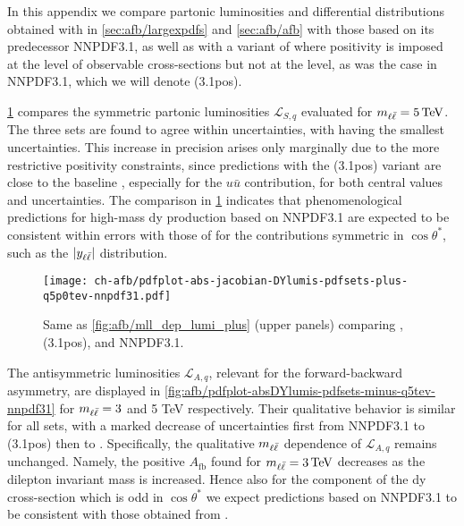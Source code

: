 
In this appendix we compare partonic luminosities and \lhc differential
distributions obtained with  in \cref{sec:afb/largexpdfs}
and \cref{sec:afb/afb} with those based 
on its predecessor
NNPDF3.1, as well as with a variant of 
where positivity is imposed at the level of observable cross-sections but
not at the \pdf level, as was the case in  NNPDF3.1, which we will denote
(3.1pos).

\cref{fig:afb/pdfplot-absDYlumis-pdfsets-plus-q5tev-nnpdf31}
compares the 
symmetric partonic luminosities $\mathcal{L}_{S,q}$
evaluated for $\mll=\SI{5}{\tera\electronvolt}$.
%
The three sets are found to agree within uncertainties,
with  having the smallest uncertainties.
%
This increase in precision
arises only marginally due to the more restrictive positivity constraints,
since predictions with the (3.1pos) variant 
are close to the baseline , especially 
for the $u\bar{u}$ contribution, for both central values and uncertainties.
%
The comparison in \cref{fig:afb/pdfplot-absDYlumis-pdfsets-plus-q5tev-nnpdf31}
indicates that phenomenological predictions for high-mass \acrlong{dy}
production based on NNPDF3.1 are expected
to be consistent within errors with those of  for the contributions
symmetric in $\cos\theta^*$, such as the $|y_{\ell\bar{\ell}}|$ distribution.

\begin{figure}[!t]
 \centering
 \texttt{[image: ch-afb/pdfplot-abs-jacobian-DYlumis-pdfsets-plus-q5p0tev-nnpdf31.pdf]}
 \caption{Same as \cref{fig:afb/mll_dep_lumi_plus} (upper panels) comparing
, (3.1pos), and NNPDF3.1.
 }    
 \label{fig:afb/pdfplot-absDYlumis-pdfsets-plus-q5tev-nnpdf31}
\end{figure}

The antisymmetric luminosities $\mathcal{L}_{A,q}$, relevant for the
forward-backward asymmetry, are displayed in \cref{fig:afb/pdfplot-absDYlumis-pdfsets-minus-q5tev-nnpdf31}
for $m_{\ell\bar{\ell}} = 3$ and 5 TeV respectively.
%
Their qualitative behavior is similar for all  \pdf sets,
with a marked decrease of \pdf uncertainties first from NNPDF3.1
to  (3.1pos)  then
to .
%
Specifically, the qualitative $m_{\ell\bar{\ell}}$ dependence
of $\mathcal{L}_{A,q}$ remains unchanged. Namely, the positive $A_{\text{fb}}$
found for $\mll= \SI{3}{\tera\electronvolt}$ decreases 
as the dilepton invariant mass is increased.
%
Hence also for the component of the \acrlong{dy} cross-section which is odd
in $\cos\theta^*$ we expect \lhc predictions based on NNPDF3.1 to be consistent
with those obtained from .

